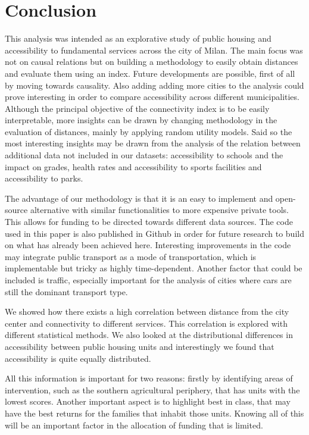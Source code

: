 \documentclass[12pt]{article}
\begin{document}
\section{Conclusion}
\label{conclusion}

This analysis was intended as an explorative study of public housing and accessibility to fundamental services across the city of Milan. The main focus was not on causal relations but on building a methodology to easily obtain distances and evaluate them using an index. Future developments are possible, first of all by moving towards causality. Also adding adding more cities to the analysis could prove interesting in order to compare accessibility across different municipalities. Although the principal objective of the connectivity index is to be easily interpretable, more insights can be drawn by changing methodology in the evaluation of distances, mainly by applying random utility models. Said so the most interesting insights may be drawn from the analysis of the relation between additional data not included in our datasets: accessibility to schools and the impact on grades, health rates and accessibility to sports facilities and accessibility to parks. 

The advantage of our methodology is that it is an easy to implement and open-source alternative with similar functionalities to more expensive private tools. This allows for funding to be directed towards different data sources. The code used in this paper is also published in Github in order for future research to build on what has already been achieved here. Interesting improvements in the code may integrate public transport as a mode of transportation, which is implementable but tricky as highly time-dependent. Another factor that could be included is traffic, especially important for the analysis of cities where cars are still the dominant transport type. 

We showed how there exists a high correlation between distance from the city center and connectivity to different services. This correlation is explored with different statistical methods. We also looked at the distributional differences in accessibility between public housing units and interestingly we found that accessibility is quite equally distributed.  

All this information is important for two reasons: firstly by identifying areas of intervention, such as the southern agricultural periphery, that has units with the lowest scores. Another important aspect is to highlight best in class, that may have the best returns for the families that inhabit those units. Knowing all of this will be an important factor in the allocation of funding that is limited. 
\end{document}
